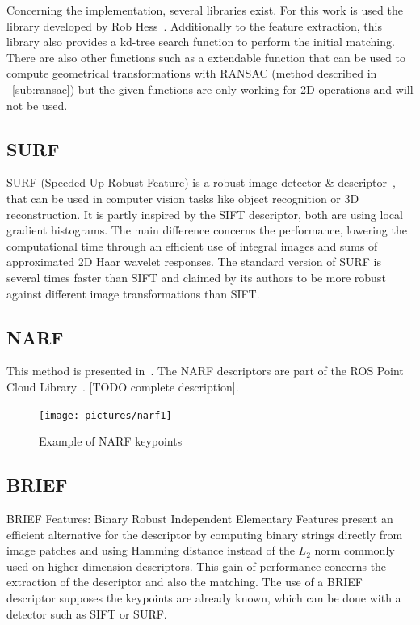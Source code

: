 Concerning the implementation, several libraries exist. For this work is used the library developed by Rob Hess~\cite{hess_sift}. Additionally to the feature extraction, this library also provides a kd-tree search function to perform the initial matching. There are also other functions such as a extendable function that can be used to compute geometrical transformations with RANSAC (method described in ~\ref{sub:ransac}) but the given functions are only working for 2D operations and will not be used.

\subsection{SURF}

SURF (Speeded Up Robust Feature) is a robust image detector \& descriptor~\cite{surf}, that can be used in computer vision tasks like object recognition or 3D reconstruction. It is partly inspired by the SIFT descriptor, both are using local gradient histograms. The main difference concerns the performance, lowering the computational time through an efficient use of integral images and sums of approximated 2D Haar wavelet responses. The standard version of SURF is several times faster than SIFT and claimed by its authors to be more robust against different image transformations than SIFT. 

\subsection{NARF}

This method is presented in~\cite{steder10irosws}. The NARF descriptors are part of the ROS Point Cloud Library~\cite{Rusu_ICRA2011_PCL}. [TODO complete description].

\begin{figure}[H]
\centering
\texttt{[image: pictures/narf1]}
\caption{Example of NARF keypoints}
\end{figure}

\subsection{BRIEF}

BRIEF Features\cite{Calonder10-brief}: Binary Robust Independent Elementary Features present an efficient alternative for the descriptor by computing  binary strings directly from image patches and using Hamming distance instead of the $L_2$ norm commonly used on higher dimension descriptors. This gain of performance concerns the extraction of the descriptor and also the matching. The use of a BRIEF descriptor supposes the keypoints are already known, which can be done with a detector such as SIFT or SURF.

